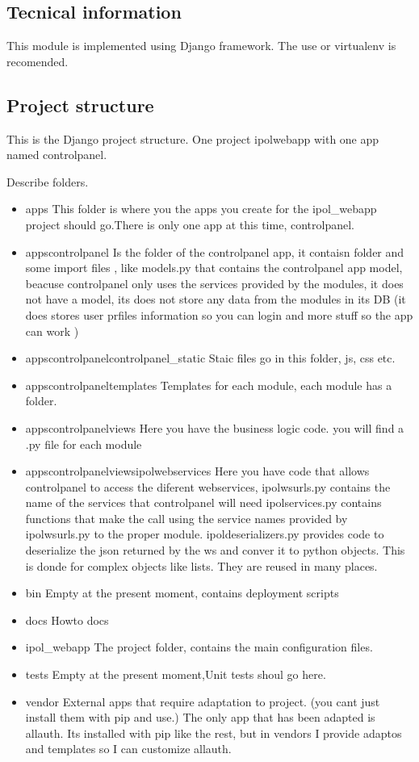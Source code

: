 \subsection{Tecnical information}
This module is implemented using Django framework.
The use or virtualenv is recomended.

\subsection{Project structure}
This is the Django project structure.
One project ipolwebapp with one app named controlpanel.

Describe folders.

\begin{itemize}
\item  apps
This folder is where you the apps you create for the ipol\_webapp project should go.There is only one app at this time, controlpanel.
\item  apps\/controlpanel
Is the folder of the controlpanel app, it contaisn folder and some import files , like models.py that contains the controlpanel app model, beacuse controlpanel only uses the services provided by the modules, it does not have a model, its does not store any data from the modules in its DB (it does stores user prfiles information so you can login and more stuff so the app can work )
\item  apps\/controlpanel\/controlpanel\_static
Staic files go in this folder, js, css etc.
\item  apps\/controlpanel\/templates
Templates for each module, each module has a folder.
\item  apps\/controlpanel\/views
Here you have the business logic code. you will find a .py file for each module
\item  apps\/controlpanel\/views\/ipolwebservices
Here you have code that allows controlpanel to access the diferent webservices, 
ipolwsurls.py contains the name of the services that controlpanel will need
ipolservices.py contains functions that make the call using the service names provided by ipolwsurls.py to the proper module.
ipoldeserializers.py provides code to deserialize the json returned by the ws and conver it to python objects. This is donde for complex objects like lists. They are reused in many places. 
\item  bin
Empty at the present moment, contains deployment scripts
\item  docs
Howto docs
\item  ipol\_webapp
The project folder, contains the main configuration files.
\item  tests
Empty at the present moment,Unit tests shoul go here.
\item  vendor
External apps that require adaptation to project. (you cant just install them with pip and use.)
The only app that has been adapted is allauth. Its installed with pip like the rest, but in vendors I provide adaptos and templates so I can customize allauth.
\end{itemize}

